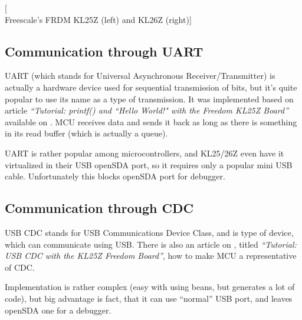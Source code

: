 [\\Freescale's FRDM KL25Z (left) and KL26Z (right)]

\subsection{Communication through UART}
UART (which stands for Universal Asynchronous Receiver/Transmitter) is actually
a hardware device used for sequential transmission of bits, but it's quite
popular to use its name as a type of transmission.
It was implemented based on article 
\emph{``Tutorial: printf() and ``Hello World!" with the Freedom KL25Z Board''}
available on \cite{mcu_on_eclipse}.
MCU receives data and sends it back as long as there is something in its read
buffer (which is actually a queue).

UART is rather popular among microcontrollers, and KL25/26Z even have it
virtualized in their USB openSDA port, so it requires only a popular mini USB
cable. 
Unfortunately this blocks openSDA port for debugger.

\subsection{Communication through CDC}
USB CDC stands for USB Communications Device Class, and is type of device, which
can communicate using USB.
There is also an article on \cite{mcu_on_eclipse}, titled
\emph{``Tutorial: USB CDC with the KL25Z Freedom Board''},
how to make MCU a representative of CDC.

Implementation is rather complex (easy with using beans, but generates a lot of
code), but big advantage is fact, that it can use ``normal'' USB port, and
leaves openSDA one for a debugger.
